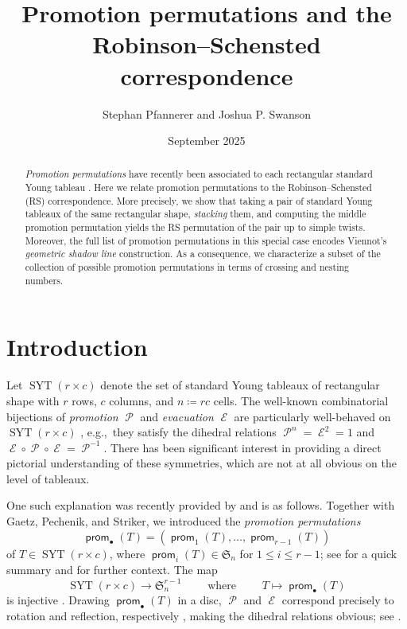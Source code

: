 \documentclass{amsart}
\title{Promotion permutations and the \\ Robinson--Schensted correspondence}
\author{Stephan Pfannerer and Joshua P. Swanson}
\date{September 2025}
\theoremstyle{definition}
\DeclareMathOperator{\SYT}{SYT}
\DeclareMathOperator{\prom}{\mathsf{prom}}
\DeclareMathOperator{\promotion}{\mathcal{P}}
\DeclareMathOperator{\evacuation}{\mathcal{E}}
\begin{document}
\begin{abstract}
    \emph{Promotion permutations} have recently been associated to each rectangular standard Young tableau \cite{fluctuating-paper}. Here we relate promotion permutations to the Robinson--Schensted (RS) correspondence. More precisely, we show that taking a pair of standard Young tableaux of the same rectangular shape, \emph{stacking} them, and computing the middle promotion permutation yields the RS permutation of the pair up to simple twists. Moreover, the full list of promotion permutations in this special case encodes Viennot's \emph{geometric shadow line} construction. As a consequence, we characterize a subset of the collection of possible promotion permutations in terms of crossing and nesting numbers.
\end{abstract}

\maketitle

\section{Introduction}\label{sec:intro}

Let $\SYT(r \times c)$ denote the set of standard Young tableaux of rectangular shape with $r$ rows, $c$ columns, and $n \coloneqq rc$ cells. The well-known combinatorial bijections of \emph{promotion} $\promotion$ and \emph{evacuation} $\evacuation$ are particularly well-behaved on $\SYT(r \times c)$ \cite{Schutzenberger-promotion,Haiman,Stanley-promotion-evacuation,fluctuating-paper}, e.g.,~they satisfy the dihedral relations $\promotion^n = \evacuation^2 = 1$ and $\evacuation \circ \promotion \circ \evacuation = \promotion^{-1}$. There has been significant interest in providing a direct pictorial understanding of these symmetries, which are not at all obvious on the level of tableaux.

One such explanation was recently provided by \cite{fluctuating-paper} and is as follows. Together with Gaetz, Pechenik, and Striker, we introduced the \emph{promotion permutations}
\[\prom_\bullet(T) = (\prom_1(T), \ldots, \prom_{r-1}(T))
\]
of $T \in \SYT(r \times c)$, where $\prom_i(T) \in \mathfrak{S}_n$ for $1 \leq i \leq r-1$; see  for a quick summary and  for further context. The map
\begin{equation}
  \SYT(r \times c) \to \mathfrak{S}_n^{r-1}\qquad\text{ where }\qquad T \mapsto \prom_\bullet(T)
\end{equation}
is injective \cite[Thm.~5.9]{fluctuating-paper}. Drawing $\prom_\bullet(T)$ in a disc, $\promotion$ and $\evacuation$ correspond precisely to rotation and reflection, respectively \cite[\S7]{fluctuating-paper}, making the dihedral relations obvious; see .
\end{document}
